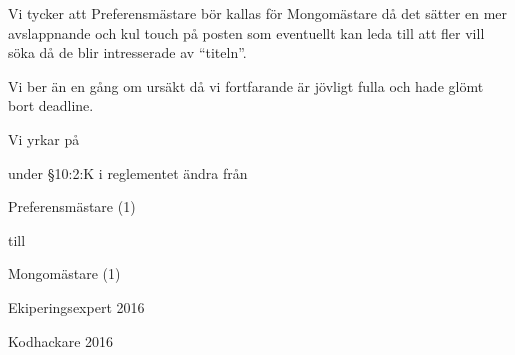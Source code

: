 \documentclass[../_main/handlingar.tex]{subfiles}
\begin{document}

Vi tycker att Preferensmästare bör kallas för Mongomästare då det sätter en mer avslappnande och kul touch på posten som eventuellt kan leda till att fler vill söka då de blir intresserade av ``titeln''.

Vi ber än en gång om ursäkt då vi fortfarande är jövligt fulla och hade glömt bort deadline.

Vi yrkar på
\begin{attsatser}
    \att under \S10:2:K i reglementet ändra från\par
    \begin{itshape}
        Preferensmästare (1)
    \end{itshape}
    \par
    till\par
    \begin{itshape}
        Mongomästare (1)
    \end{itshape}
\end{attsatser}

\begin{signatures}{2}
    \mvh
    \signature{Daniel Bakic}{Ekiperingsexpert 2016}
    \signature{Axel Voss}{Kodhackare 2016}
\end{signatures}
\end{document}
